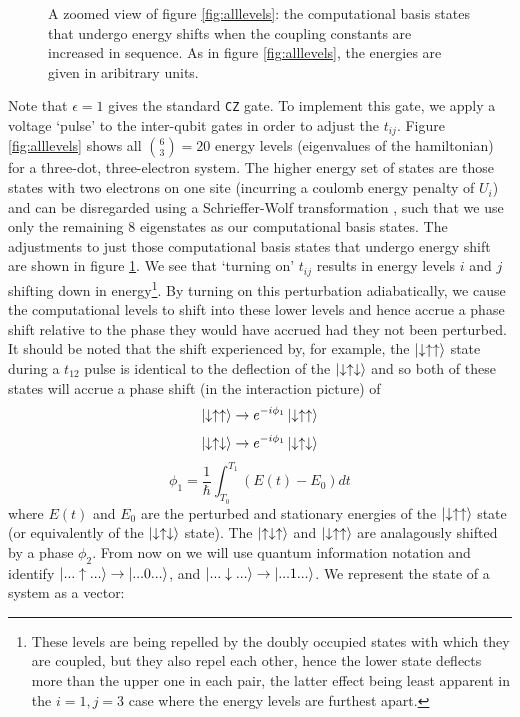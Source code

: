 \documentclass{report}
\begin{document}
\begin{appendices}
\begin{figure}[ht]
    \caption{A zoomed view of figure \ref{fig:alllevels}: the computational basis states that undergo energy shifts when the coupling constants are increased in sequence. As in figure \ref{fig:alllevels}, the energies are given in aribitrary units.}
    \label{fig:complevels}
\end{figure}

Note that $\epsilon = 1$ gives the standard \texttt{CZ} gate. To implement this gate, we apply a voltage `pulse' to the inter-qubit gates in order to adjust the $t_{ij}$. Figure \ref{fig:alllevels} shows all $\binom{6}{3} = 20$ energy levels (eigenvalues of the hamiltonian) for a three-dot, three-electron system. The higher energy set of states are those states with two electrons on one site (incurring a coulomb energy penalty of $U_i$) and can be disregarded using a Schrieffer-Wolf transformation \cite{bravyi_2011}, such that we use only the remaining 8 eigenstates as our computational basis states. The adjustments to just those computational basis states that undergo energy shift are shown in figure \ref{fig:complevels}. We see that `turning on' $t_{ij}$ results in energy levels $i$ and $j$ shifting down in energy\footnote{These levels are being repelled by the doubly occupied states with which they are coupled, but they also repel each other, hence the lower state deflects more than the upper one in each pair, the latter effect being least apparent in the $i = 1, j = 3$ case where the energy levels are furthest apart.}. By turning on this perturbation adiabatically, we cause the computational levels to shift into these lower levels and hence accrue a phase shift relative to the phase they would have accrued had they not been perturbed. It should be noted that the shift experienced by, for example, the $\ket{\downarrow\uparrow\uparrow}$ state during a $t_{12}$ pulse is identical to the deflection of the $\ket{\downarrow\uparrow\downarrow}$ and so both of these states will accrue a phase shift (in the interaction picture) of 
\begin{equation*}
    \ket{\downarrow\uparrow\uparrow} \rightarrow e^{-i\phi_1} \ket{\downarrow\uparrow\uparrow}
\end{equation*}
\begin{equation*}
    \ket{\downarrow\uparrow\downarrow} \rightarrow e^{-i\phi_1} \ket{\downarrow\uparrow\downarrow}
\end{equation*}
\begin{equation*}
    \phi_1 = \frac{1}{\hbar}\int_{T_0}^{T_1}{(E(t) - E_0)dt}
\end{equation*} where $E(t)$ and $E_0$ are the perturbed and stationary energies of the $\ket{\downarrow\uparrow\uparrow}$ state (or equivalently of the $\ket{\downarrow\uparrow\downarrow}$ state). The $\ket{\uparrow\downarrow\uparrow}$ and $\ket{\downarrow\uparrow\uparrow}$ are analagously shifted by a phase $\phi_2$. From now on we will use quantum information notation and identify $\ket{...\uparrow...} \rightarrow \ket{...0...}$, and $\ket{...\downarrow...} \rightarrow \ket{...1...}$. We represent the state of a system as a vector:

\end{appendices}
\end{document}
